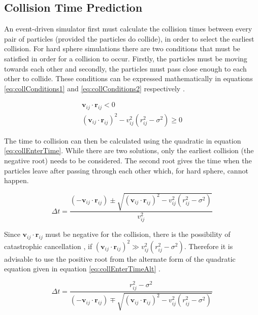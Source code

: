 \message{ !name(main.tex)}\documentclass[12pt]{UoAthesis}
\begin{document}
\subsection{Collision Time Prediction}
An event-driven simulator first must calculate the collision times
between every pair of particles (provided the particles do collide),
in order to select the earliest collision.  For hard sphere
simulations there are two conditions that must be satisfied in order
for a collision to occur.  Firstly, the particles must be moving
towards each other and secondly, the particles must pass close enough
to each other to collide.  These conditions can be expressed
mathematically in equations \eqref{eq:collConditions1} and
\eqref{eq:collConditions2} respectively \cite{Haile1997}.

\begin{subequations}
  \begin{align}
    \mathbf{v}_{ij}\cdot\mathbf{r}_{ij} < 0 \label{eq:collConditions1}\\
    (\mathbf{v}_{ij}\cdot\mathbf{r}_{ij})^2 
    - v_{ij}^2(r_{ij}^2 - \sigma^2) \geq 0 \label{eq:collConditions2}
  \end{align}
\end{subequations}

The time to collision can then be calculated using the quadratic in
equation \eqref{eq:collEnterTime}.  While there are two solutions,
only the earliest collision (the negative root) needs to be
considered.  The second root gives the time when the particles leave
after passing through each other which, for hard sphere, cannot
happen.

\begin{equation}
\Delta t = \frac{(-\mathbf{v}_{ij}\cdot\mathbf{r}_{ij}) \pm 
  \sqrt{(\mathbf{v}_{ij}\cdot\mathbf{r}_{ij})^2 - v_{ij}^2(r_{ij}^2 - \sigma^2)}}
       {v_{ij}^2} \label{eq:collEnterTime}
\end{equation}

Since $\mathbf{v}_{ij}\cdot\mathbf{r}_{ij}$ must be negative for the
collision, there is the possibility of catastrophic cancellation
\cite{Goldberg1991}, if $(\mathbf{v}_{ij}\cdot\mathbf{r}_{ij})^2 \gg
v_{ij}^2(r_{ij}^2 - \sigma^2)$. Therefore it is advisable to use the
positive root from the alternate form of the quadratic equation given
in equation \eqref{eq:collEnterTimeAlt} \cite{Poschel2005}.

\begin{equation}
\Delta t = \frac{r_{ij}^2 - \sigma^2}{(-\mathbf{v}_{ij}\cdot\mathbf{r}_{ij})
  \mp \sqrt{(\mathbf{v}_{ij}\cdot\mathbf{r}_{ij})^2 
    - v_{ij}^2(r_{ij}^2 - \sigma^2)}}
\label{eq:collEnterTimeAlt}
\end{equation}
\end{document}
